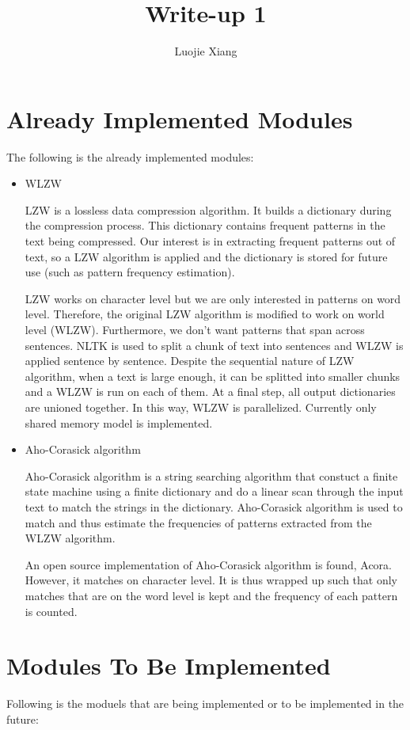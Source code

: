 \documentclass{article}
\title{Write-up 1}
\author{Luojie Xiang}
\date{}
\begin{document}
\maketitle

\section{Already Implemented Modules}
The following is the already implemented modules:

\begin{itemize}
\item WLZW 

LZW is a lossless data compression algorithm. It builds a dictionary during the compression process. This dictionary contains frequent patterns in the text being compressed. Our interest is in extracting frequent patterns out of text, so a LZW algorithm is applied and the dictionary is stored for future use (such as pattern frequency estimation). 

LZW works on character level but we are only interested in patterns on word level. Therefore, the original LZW algorithm is modified to work on world level (WLZW). Furthermore, we don't want patterns that span across sentences. NLTK is used to split a chunk of text into sentences and WLZW is applied sentence by sentence. Despite the sequential nature of LZW algorithm, when a text is large enough, it can be splitted into smaller chunks and a WLZW is run on each of them. At a final step, all output dictionaries are unioned together. In this way, WLZW is parallelized. Currently only shared memory model is implemented.

\item Aho-Corasick algorithm

Aho-Corasick algorithm is a string searching algorithm that constuct a finite state machine using a finite dictionary and do a linear scan through the input text to match the strings in the dictionary. Aho-Corasick algorithm is used to match and thus estimate the frequencies of patterns extracted from the WLZW algorithm.

An open source implementation of Aho-Corasick algorithm is found, Acora. However, it matches on character level. It is thus wrapped up such that only matches that are on the word level is kept and the frequency of each pattern is counted.

\end{itemize}
\section{Modules To Be Implemented}
Following is the moduels that are being implemented or to be implemented in the future:
\end{document}
